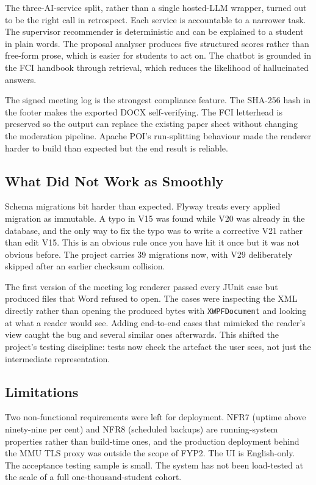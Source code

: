 \documentclass[conference,a4paper]{IEEEtran}
\begin{document}
The three-AI-service split, rather than a single hosted-LLM wrapper, turned out to be the right call in retrospect. Each service is accountable to a narrower task. The supervisor recommender is deterministic and can be explained to a student in plain words. The proposal analyser produces five structured scores rather than free-form prose, which is easier for students to act on. The chatbot is grounded in the FCI handbook through retrieval, which reduces the likelihood of hallucinated answers.

The signed meeting log is the strongest compliance feature. The SHA-256 hash in the footer makes the exported DOCX self-verifying. The FCI letterhead is preserved so the output can replace the existing paper sheet without changing the moderation pipeline. Apache POI's run-splitting behaviour made the renderer harder to build than expected but the end result is reliable.

\subsection{What Did Not Work as Smoothly}
Schema migrations bit harder than expected. Flyway treats every applied migration as immutable. A typo in V15 was found while V20 was already in the database, and the only way to fix the typo was to write a corrective V21 rather than edit V15. This is an obvious rule once you have hit it once but it was not obvious before. The project carries 39 migrations now, with V29 deliberately skipped after an earlier checksum collision.

The first version of the meeting log renderer passed every JUnit case but produced files that Word refused to open. The cases were inspecting the XML directly rather than opening the produced bytes with \texttt{XWPFDocument} and looking at what a reader would see. Adding end-to-end cases that mimicked the reader's view caught the bug and several similar ones afterwards. This shifted the project's testing discipline: tests now check the artefact the user sees, not just the intermediate representation.

\subsection{Limitations}
Two non-functional requirements were left for deployment. NFR7 (uptime above ninety-nine per cent) and NFR8 (scheduled backups) are running-system properties rather than build-time ones, and the production deployment behind the MMU TLS proxy was outside the scope of FYP2. The UI is English-only. The acceptance testing sample is small. The system has not been load-tested at the scale of a full one-thousand-student cohort.
\end{document}
